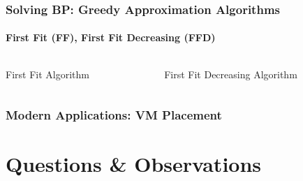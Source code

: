 \documentclass[10pt,    %
    english,            %
    xcolor=table,       %
    envcountsect,        %
    aspectratio=169     %
]{beamer}
\begin{document}
\begin{frame}
    \frametitle{Solving BP: Greedy Approximation Algorithms}
    \framesubtitle{First Fit (FF), First Fit Decreasing (FFD)}

    \begin{columns}
        \begin{column}{.45\textwidth}
            \begin{algorithm2e}[H]
                \caption{First Fit Algorithm}
            \end{algorithm2e}
        \end{column}
        \begin{column}{.45\textwidth}
            \begin{algorithm2e}[H]
                \caption{First Fit Decreasing Algorithm}
            \end{algorithm2e}
        \end{column}
    \end{columns}
\end{frame}

\begin{frame}
    \frametitle{Modern Applications: VM Placement}

\end{frame}


\section{Questions \& Observations}
\sectionframe
\end{document}
